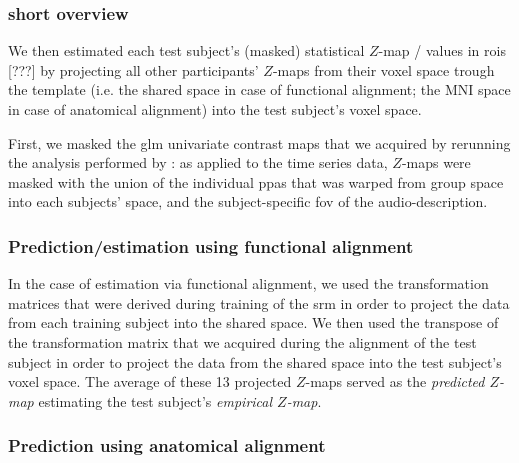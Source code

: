 


\subsubsection{short overview}
%
We then estimated each test subject's (masked) statistical $Z$-map / values in
\acp{roi} [???] by projecting all other participants' $Z$-maps from their voxel
space trough the template (i.e. the shared space in case of functional
alignment; the MNI space in case of anatomical alignment) into the test
subject's voxel space.

%
First, we masked the \ac{glm} univariate contrast maps that we acquired by
rerunning the analysis performed by \citet{hanke2016simultaneous}:
%
as applied to the time series data, $Z$-maps were masked with the union of the
individual \acp{ppa} \citep[s.][]{haeusler2022processing} that was warped from
group space into each subjects' space, and the subject-specific \ac{fov} of the
audio-description.

\subsubsection{Prediction/estimation using functional alignment}

In the case of estimation via functional alignment, we used the transformation
matrices that were derived during training of the \ac{srm} in order to project
the data from each training subject into the shared space.
We then used the transpose of the transformation matrix that we acquired during
the alignment of the test subject in order to project the data from the shared
space into the test subject's voxel space.
The average of these 13 projected $Z$-maps served as the \textit{predicted
$Z$-map} estimating the test subject's \textit{empirical $Z$-map}.


\subsubsection{Prediction using anatomical alignment}

